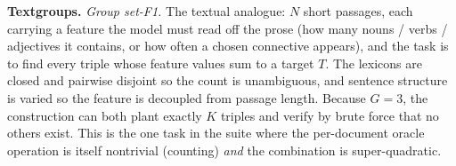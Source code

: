 
\textbf{Textgroups.} \emph{Group set-F1.} The textual analogue: $N$ short passages, each carrying a feature the model must read off the prose (how many nouns / verbs / adjectives it contains, or how often a chosen connective appears), and the task is to find every triple whose feature values sum to a target $T$. The lexicons are closed and pairwise disjoint so the count is unambiguous, and sentence structure is varied so the feature is decoupled from passage length. Because $G{=}3$, the construction can both plant exactly $K$ triples and verify by brute force that no others exist. This is the one task in the suite where the per-document oracle operation is itself nontrivial (counting) \emph{and} the combination is super-quadratic.
